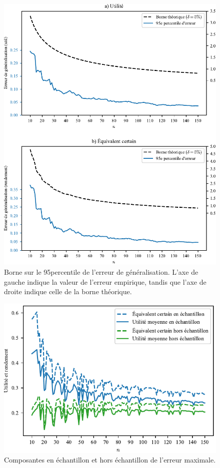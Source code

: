 \begin{figure}[h!]
  \centering
  \includegraphics[width=\textwidth]{../../experiments/fig/bound_errgen.pdf}
  \caption[Borne théorique sur l'erreur de généralisation]{Borne sur le 95\ieme percentile
    de l'erreur de généralisation. L'axe de gauche indique la valeur de l'erreur
    empirique, tandis que l'axe de droite indique celle de la borne théorique.}
  \label{fig_bound_errgen}
\end{figure}

\begin{figure}[h!]
  \centering
  \includegraphics[width=\textwidth]{../../experiments/fig/bound_gencomps.pdf}
  \caption[Composantes de l'erreur maximale]{Composantes en échantillon et hors
    échantillon de l'erreur maximale.}
  \label{fig_bound_gencomps}
\end{figure}

